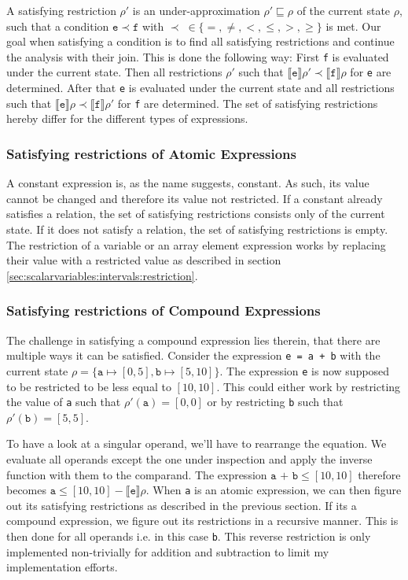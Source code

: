 A satisfying restriction $\rho'$ is an under-approximation $\rho'\sqsubseteq\rho$ of the current state $\rho$, such that a condition $\mathtt{e}\prec\mathtt{f}$ with $\prec \;\in \{=,\neq,<,\leq,>,\geq\}$ is met. Our goal when satisfying a condition is to find all satisfying restrictions and continue the analysis with their join. This is done the following way: First \texttt{f} is evaluated under the current state. Then all restrictions $\rho'$ such that $\llbracket\mathtt{e}\rrbracket\rho'\prec\llbracket\mathtt{f}\rrbracket\rho$ for \texttt{e} are determined. After that \texttt{e} is evaluated under the current state and all restrictions such that $\llbracket\mathtt{e}\rrbracket\rho\prec\llbracket\mathtt{f}\rrbracket\rho'$ for \texttt{f} are determined. The set of satisfying restrictions hereby differ for the different types of expressions.


\subsubsection{Satisfying restrictions of Atomic Expressions}

A constant expression is, as the name suggests, constant. As such, its value cannot be changed and therefore its value not restricted. If a constant already satisfies a relation, the set of satisfying restrictions consists only of the current state. If it does not satisfy a relation, the set of satisfying restrictions is empty. The restriction of a variable or an array element expression works by replacing their value with a restricted value as described in section \ref{sec:scalarvariables:intervals:restriction}. 

\subsubsection{Satisfying restrictions of Compound Expressions}

The challenge in satisfying a compound expression lies therein, that there are multiple ways it can be satisfied. Consider the expression \texttt{e = a + b} with the current state $\rho=\{\mathtt{a}\mapsto[0,5],\mathtt{b}\mapsto[5,10]\}$. The expression \texttt{e} is now supposed to be restricted to be less equal to $[10,10]$. This could either work by restricting the value of \texttt{a} such that $\rho'(\mathtt{a})=[0,0]$ or by restricting \texttt{b} such that $\rho'(\mathtt{b})=[5,5]$.

To have a look at a singular operand, we'll have to rearrange the equation. We evaluate all operands except the one under inspection and apply the inverse function with them to the comparand. The expression $\texttt{a + b} \leq [10,10]$ therefore becomes $\texttt{a} \leq [10,10] - \llbracket\texttt{e}\rrbracket\rho$. When \texttt{a} is an atomic expression, we can then figure out its satisfying restrictions as described in the previous section. If its a compound expression, we figure out its restrictions in a recursive manner. This is then done for all operands i.e. in this case \texttt{b}. This reverse restriction is only implemented non-trivially for addition and subtraction to limit my implementation efforts. 

